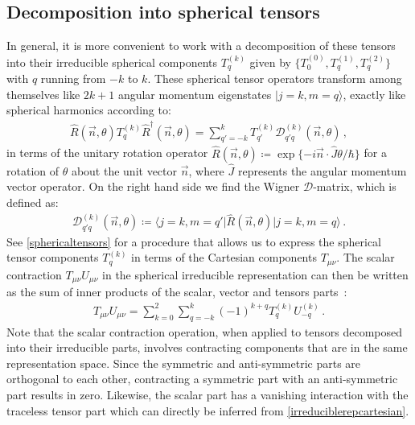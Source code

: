 \documentclass[../Thesis-IJspeert.tex]{subfiles}
\begin{document}
\subsection{Decomposition into spherical tensors}
In general, it is more convenient to work with a decomposition of these tensors into their irreducible spherical components $T_q^{(k)}$ given by $\{T_0^{(0)}, T_{q}^{(1)}, T_{q}^{(2)}\}$ with $q$ running from $-k$ to $k$. These spherical tensor operators transform among themselves like $2k+1$ angular momentum eigenstates $\vert j = k, m = q\rangle$, exactly like spherical harmonics according to:
\begin{align}
\hat{R}(\vec{n}, \theta)T_q^{(k)} \hat{R}^\dagger(\vec{n}, \theta)= \sum_{q'=-k}^{k} T_{q'}^{(k)}\mathcal{D}_{q'q}^{(k)}(\vec{n}, \theta)\,,
\end{align}
in terms of the unitary rotation operator $\hat{R}(\vec{n}, \theta)\coloneqq\exp \{-i\vec{n}\cdot \hat{J}\theta/\hbar\}$ for a rotation of $\theta$ about the unit vector $\vec{n}$, where $\hat{J}$ represents the angular momentum vector operator. On the right hand side we find the Wigner $\mathcal{D}$-matrix, which is defined as:
\begin{align}
\mathcal{D}_{q'q}^{(k)}(\vec{n}, \theta)\coloneqq\langle j=k, m=q' \vert \hat{R}(\vec{n}, \theta) \vert j=k, m=q \rangle\,.
\end{align}
See \autoref{sphericaltensors} for a procedure that allows us to express the spherical tensor components $T_q^{(k)}$ in terms of the Cartesian components $T_{\mu\nu}$. The scalar contraction $T_{\mu\nu}U_{\mu\nu}$ in the spherical irreducible representation can then be written as the sum of inner products of the scalar, vector and tensors parts~\cite{Man2013}:
\begin{align}
\label{scalarcontraction}
	T_{\mu\nu} U_{\mu\nu} = 
	\sum_{k=0}^{2} \sum_{q=-k}^{k} (-1)^{k+q} T^{(k)}_q U^{(k)}_{-q}\,.
\end{align}
Note that the scalar contraction operation, when applied to tensors decomposed into their irreducible parts, involves contracting components that are in the same representation space. Since the symmetric and anti-symmetric parts are orthogonal to each other, contracting a symmetric part with an anti-symmetric part results in zero. Likewise, the scalar part has a vanishing interaction with the traceless tensor part which can directly be inferred from \autoref{irreduciblerepcartesian}.
\end{document}
